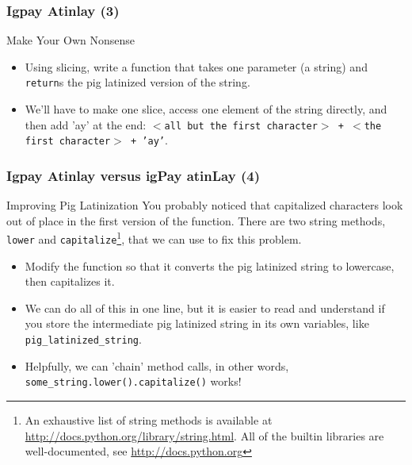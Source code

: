 \documentclass[10pt]{beamer}
\begin{document}
\begin{frame}[fragile]
  \frametitle{Igpay Atinlay (3)}
  \begin{block}{Make Your Own Nonsense}
    \begin{itemize}
      \item Using slicing, write a function that takes one parameter (a string) and \texttt{return}s the pig latinized version of the string.
      \item We'll have to make one slice, access one element of the string directly, and then add 'ay' at the end:
        \texttt{$<$all but the first character$>$ + $<$the first character$>$ + 'ay'}.
    \end{itemize}
  \end{block}
\end{frame}

\begin{frame}
  \frametitle{Igpay Atinlay versus igPay atinLay (4)}
  \begin{block}{Improving Pig Latinization}
    You probably noticed that capitalized characters look out of place in the first version of the function.
    There are two string methods, \texttt{lower} and \texttt{capitalize}\footnote{An exhaustive list of string methods is available at \href{http://docs.python.org/library/string.html}{http://docs.python.org/library/string.html}.  All of the builtin libraries are well-documented, see \href{http://docs.python.org}{http://docs.python.org}}, that we can use to fix this problem.
    \begin{itemize}
      \item Modify the function so that it converts the pig latinized string to lowercase, then capitalizes it.
      \item We can do all of this in one line, but it is easier to read and understand if you store the intermediate pig latinized string in its own variables, like \texttt{pig\_latinized\_string}.
      \item Helpfully, we can 'chain' method calls, in other words, \texttt{some\_string.lower().capitalize()} works!
    \end{itemize}
  \end{block}
\end{frame}
\end{document}
